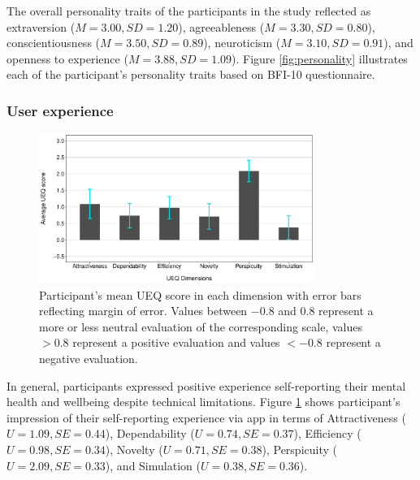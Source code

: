     The overall personality traits of the participants in the study reflected as 
        extraversion    ($ M = 3.00, SD = 1.20 $),  
        agreeableness   ($ M = 3.30, SD = 0.80 $),    
        conscientiousness   ($ M = 3.50, SD = 0.89 $),    
        neuroticism ($ M = 3.10, SD = 0.91 $), and
        openness to experience  ($ M = 3.88, SD = 1.09 $).
    Figure \ref{fig:personality} illustrates each of the participant's personality traits based on \ac{BFI-10} questionnaire.


    \subsubsection{User experience}    
    \begin{figure}
        \centering
        \includegraphics[clip, trim=0cm 0cm 0.5cm 0.5cm, width=0.8\textwidth]{figures/ueq.pdf}
        \caption{Participant's mean \ac{UEQ} score in each dimension with error bars reflecting margin of error.
        Values between $-0.8$ and $0.8$ represent a more or less neutral evaluation of the corresponding scale,  values $> 0.8$ represent a positive evaluation and values $< -0.8$ represent a negative evaluation.}
        \label{fig:ueq}
    \end{figure}

    In general, participants expressed positive experience self-reporting their mental health and wellbeing despite technical limitations. 
    Figure \ref{fig:ueq} shows participant's impression of their self-reporting experience via \acl{app} in terms of
        Attractiveness ($U = 1.09, SE = 0.44 $),
        Dependability ($U = 0.74, SE = 0.37 $),
        Efficiency ($U = 0.98, SE = 0.34 $),
        Novelty ($U = 0.71, SE = 0.38 $),
        Perspicuity ($U = 2.09, SE = 0.33 $), and
        Simulation ($U = 0.38, SE = 0.36 $).
        
